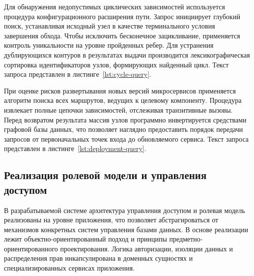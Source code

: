 Для обнаружения недопустимых циклических зависимостей используется процедура 
конфигурационного расширения пути. Запрос инициирует глубокий поиск, устанавливая 
исходный узел в качестве терминального условия завершения обхода. Чтобы исключить 
бесконечное зацикливание, применяется контроль уникальности на уровне пройденных 
ребер. Для устранения дублирующихся контуров в результатах выдачи производится 
лексикографическая сортировка идентификаторов узлов, формирующих найденный цикл.
Текст запроса представлен в листинге~\ref{lst:cycle-query}.


При оценке рисков развертывания новых версий микросервисов применяется алгоритм 
поиска всех маршрутов, ведущих к целевому компоненту. Процедура извлекает полные 
цепочки зависимостей, отслеживая транзитивные вызовы. Перед возвратом результата 
массив узлов программно инвертируется средствами графовой базы данных, что 
позволяет наглядно предоставить порядок передачи запросов от первоначальных 
точек входа до обновляемого сервиса.
Текст запроса представлен в листинге~\ref{lst:deployment-query}.


\subsection[Реализация ролевой модели и управления доступом]
{Реализация ролевой модели и управления \\доступом}

В разрабатываемой системе архитектура управления доступом и ролевая модель 
реализованы на уровне приложения, что позволяет абстрагироваться 
от механизмов конкретных систем управления базами данных. В основе 
реализации лежит объектно-ориентированный подход и принципы предметно-ориентированного 
проектирования. Логика авторизации, изоляции данных и распределения прав инкапсулирована 
в доменных сущностях и специализированных сервисах приложения.

